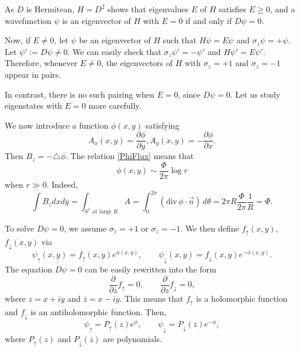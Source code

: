 \documentclass[12pt]{article}
\numberwithin{equation}{section}
\numberwithin{figure}{section}
\theoremstyle{remark}
\let\bar\overline
\begin{document}
As $D$ is Hermitean, $H=D^2$ shows that eigenvalues $E$ of $H$ satisfies $E\ge 0$,
and a wavefunction $\psi$ is an eigenvector of $H$ with $E=0$ 
if and only if $D\psi =0$.

Now,  if $E\neq 0$, let $\psi$ be an eigenvector of $H$ such that $H\psi = E\psi$
and $\sigma_z \psi = + \psi$.
Let  $\psi':= D\psi \neq 0$. We can easily check that $\sigma_z \psi'=-\psi'$ and $H\psi'=E\psi'$.
Therefore, whenever $E\neq 0$, the eigenvectors of $H$ with $\sigma_z=+1$ 
and $\sigma_z=-1$ appear in pairs.

In contrast, there is no such pairing when $E=0$, since $D\psi=0$. 
Let us study eigenstates with $E=0$ more carefully.

We now introduce a function $\phi(x,y)$ satisfying 
\begin{equation}
A_x(x,y)=\frac{\partial\phi}{\partial y}, 
A_y(x,y)=-\frac{\partial\phi}{\partial x}.
\end{equation}
Then $B_z=-\triangle \phi$.
The relation \eqref{PhiFlux} means that \begin{equation}
\phi(x,y) \sim \frac{\Phi}{2\pi}\log  r
\end{equation} when $r\gg 0$. 
Indeed, \begin{equation}
\int B_z dxdy = \int_{\text{$S^1$ at large $R$}} A 
= \int_{0}^{2\pi}  (\mathrm{div}\, \phi \cdot \vec n )\,  d\theta = 2\pi R  \frac{\Phi}{2\pi} \frac{1}R 
=\Phi.
\end{equation}

To solve $D\psi=0$, we assume $\sigma_z=+1$ or $\sigma_z=-1$.
We then define $f_\uparrow(x,y)$, $f_\downarrow(x,y)$ via\begin{equation}
	\psi_\uparrow(x,y)=f_\uparrow(x,y) e^{\phi(x,y)}, \qquad
	\psi_\downarrow(x,y)=f_\downarrow(x,y) e^{-\phi(x,y)}.
\end{equation} 
The equation $D\psi=0$ can be easily rewritten into the form \begin{equation}
\frac{ \partial } {\partial \bar z} f_\uparrow =0,\qquad
\frac{ \partial } {\partial  z} f_\downarrow =0,
\end{equation}
where $z=x+iy$ and $\bar z=x-iy$. This means that $f_\uparrow$ is a holomorphic function
and $f_\downarrow$ is an antiholomorphic function.
Then, \begin{equation}
\psi_\uparrow = P_\uparrow(z) e^\phi, \qquad
\psi_\downarrow = P_\downarrow(\bar z) e^{-\phi}, 
\end{equation}
where $P_\uparrow(z)$ and $P_\downarrow(\bar z)$ are polynomials.
\end{document}
